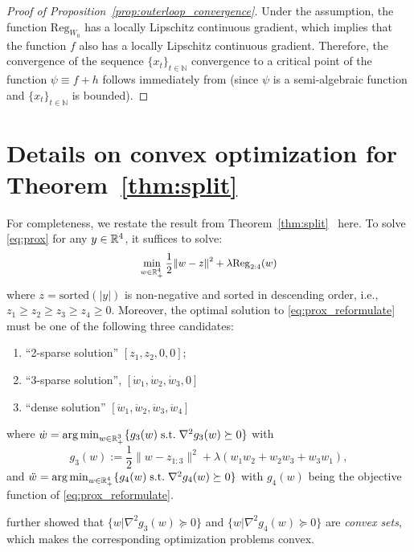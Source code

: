 \begin{proof}[Proof of Proposition~\ref{prop:outerloop_convergence}]

Under the assumption, the function $\text{Reg}_{W_0}$ has a locally Lipschitz continuous gradient, which implies that the function $f$ also has a locally Lipschitz continuous gradient. Therefore, the convergence of the sequence $\{x_{t} \}_{t \in \mathbb{N}}$ convergence to a critical point of the function $\psi \equiv f + h$ follows immediately from \cite{CHT2022} (since $\psi$ is a semi-algebraic function and $\{x_{t} \}_{t \in \mathbb{N}}$ is bounded). 

\end{proof}
\section{Details on convex optimization for Theorem~\ref{thm:split}}
\label{theory_detail}
For completeness, we restate the result from Theorem~\ref{thm:split}~\cite{jonas_paper} here. To solve \eqref{eq:prox} for any $y\in\mathbb{R}^4$, it suffices to solve: 
\begin{equation}\label{eq:prox_reformulate}
\small
\begin{aligned}
    \min_{w \in \mathbb{R}_+^4} \frac{1}{2} \|w - z\|^2 + \lambda \mathrm{Reg}_{2:4}(w)
\end{aligned}
\end{equation}
where $z = \mathrm{sorted}(|y|)$ is non-negative and sorted in descending order, i.e., $z_1\geq z_2\geq z_3 \geq z_4\geq 0$. Moreover, the optimal solution to \eqref{eq:prox_reformulate} must be one of the following three candidates:
\begin{enumerate}
    \item ``2-sparse solution'' $[z_1,z_2, 0,0]$; 
    \item ``3-sparse solution'', $[\dot{w}_1,\dot{w}_2,\dot{w}_3,0]$
    \item ``dense solution'' $[\ddot{w}_1,\ddot{w}_2,\ddot{w}_3,\ddot{w}_4]$
\end{enumerate}
where $\dot{w} = \operatorname*{arg\,min}_{w\in\mathbb{R}_+^3} \{g_3(w) \; \text{s.t.}\; \nabla^2 g_3(w) \succeq 0 \}$ with $$g_3(w) :=\frac{1}{2}\|w - z_{1:3}\|^2 + \lambda (w_1w_2 + w_2w_3 + w_3 w_1),$$
and $\ddot{w} = \operatorname*{arg\,min}_{w\in\mathbb{R}_+^4} \{g_4(w) \; \text{s.t.}\; \nabla^2 g_4(w) \succeq 0 \}$ with $g_4(w)$ being the objective function of \eqref{eq:prox_reformulate}.

\citet{jonas_paper} further showed that $\{w | \nabla^2 g_3(w)\succeq 0 \}$ and  $\{ w | \nabla^2 g_4(w)\succeq 0 \}$ are \emph{convex sets}, which makes the corresponding optimization problems convex.

